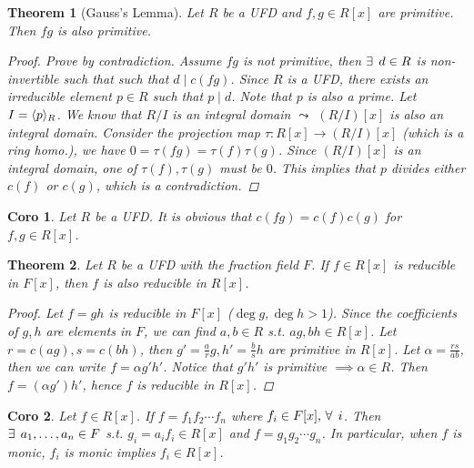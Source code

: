 \documentclass[a4paper]{article}
\let\existstemp\exists
\let\foralltemp\forall
\renewcommand*{\exists}{\existstemp\mkern4mu}
\renewcommand*{\forall}{\foralltemp\mkern4mu}
\DeclarePairedDelimiter{\gen}{\langle}{\rangle} %
\newcommand*\quot[2]{{#1}/{#2}}
\theoremstyle{mystyle}
\newtheorem{theorem}{Theorem}
\newtheorem{coro}{Coro}
\begin{document}
\begin{theorem}[Gauss's Lemma]
  Let $R$ be a UFD and $f, g \in R[x]$ are primitive. Then $fg$
  is also primitive.
  \begin{proof}
    Prove by contradiction. Assume $fg$ is not primitive, then
    $\exists d \in R$ is non-invertible such that such that $d \mid c(fg)$.
    Since $R$ is a UFD, there exists an irreducible element $p \in R$
    such that $p \mid d$. Note that $p$ is also a prime. Let $I = \gen{p}_R$.
    We know that $\quot{R}{I}$ is an integral domain $\leadsto$
    $(\quot{R}{I})[x]$ is also an integral domain.
    Consider the projection map $\tau: R[x] \to (\quot{R}{I})[x]$ (which is
    a ring homo.), we have $0 = \tau(fg) = \tau(f)\tau(g)$. Since
    $(\quot{R}{I})[x]$ is an integral domain, one of $\tau(f), \tau(g)$ must
    be $0$. This implies that $p$ divides either $c(f)$ or $c(g)$,
    which is a contradiction.
  \end{proof}
\end{theorem}

\begin{coro}
  Let $R$ be a UFD. It is obvious that $c(fg) = c(f)c(g)$ for $f, g \in R[x]$.
\end{coro}

\begin{theorem}
  Let $R$ be a UFD with the fraction field $F$. If $f \in R[x]$
  is reducible in $F[x]$, then $f$ is also reducible in $R[x]$.

  \begin{proof}
    Let $f = gh$ is reducible in $F[x]$ ($\deg g, \deg h > 1$).
    Since the coefficients of $g, h$ are elements in $F$, we can find
    $a, b \in R$ s.t. $ag, bh \in R[x]$. Let $r = c(ag), s = c(bh)$, then
    $g' = \frac{a}{r}g, h' = \frac{b}{s}h$ are primitive in $R[x]$.
    Let $\alpha = \frac{rs}{ab}$, then we can write $f = \alpha g' h'$.
    Notice that $g'h'$ is primitive $\implies \alpha \in R$.
    Then $f = (\alpha g')  h'$, hence $f$ is reducible in $R[x]$.
  \end{proof}
\end{theorem}

\begin{coro}
  Let $f \in R[x]$. If $f = f_1 f_2 \dotsm f_n$ where $f_i \in F[x],\, \forall i$.
  Then $\exists a_1, \dots, a_n \in F$ s.t. $g_i = a_if_i \in R[x]$ and
  $f = g_1 g_2 \dotsm g_n$.
  In particular, when $f$ is monic, $f_i$ is monic implies $f_i \in R[x]$.
\end{coro}
\end{document}
